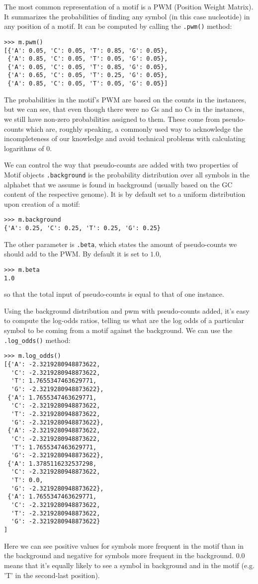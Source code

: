 \documentclass{article}
\begin{document}
The most common representation of a motif is a PWM (Position Weight
Matrix). It summarizes the probabilities of finding any symbol (in
this case nucleotide) in any position of a motif. It can be computed by calling the \verb|.pwm()| method:
\begin{verbatim}
>>> m.pwm()
[{'A': 0.05, 'C': 0.05, 'T': 0.85, 'G': 0.05}, 
 {'A': 0.85, 'C': 0.05, 'T': 0.05, 'G': 0.05}, 
 {'A': 0.05, 'C': 0.05, 'T': 0.85, 'G': 0.05}, 
 {'A': 0.65, 'C': 0.05, 'T': 0.25, 'G': 0.05}, 
 {'A': 0.85, 'C': 0.05, 'T': 0.05, 'G': 0.05}]
\end{verbatim}
The probabilities in the motif's PWM are based on the counts in the
instances, but we can see, that even though there were no Gs and no Cs
in the instances, we still have non-zero probabilities assigned to
them. These come from pseudo-counts which are, roughly speaking, a
commonly used way to acknowledge the incompleteness of our knowledge
and avoid technical problems with calculating logarithms of $0$.

We can control the way that pseudo-counts are added with two
properties of Motif objects \verb|.background| is the probability
distribution over all symbols in the alphabet that we assume is found
in background (usually based on the GC content of the respective
genome). It is by default set to a uniform distribution upon creation of a motif:
\begin{verbatim}
>>> m.background  
{'A': 0.25, 'C': 0.25, 'T': 0.25, 'G': 0.25}
\end{verbatim}
The other parameter is \verb|.beta|, which states the amount of
pseudo-counts we should add to the PWM. By default it is set to $1.0$,
\begin{verbatim}
>>> m.beta
1.0
\end{verbatim}
so that the total input of pseudo-counts is equal to that of one instance. 

Using the background distribution and pwm with pseudo-counts added,
it's easy to compute the log-odds ratios, telling us what are the log
odds of a particular symbol to be coming from a motif against the
background. We can use the \verb|.log_odds()| method:

\begin{verbatim}
>>> m.log_odds()
[{'A': -2.3219280948873622, 
  'C': -2.3219280948873622, 
  'T': 1.7655347463629771, 
  'G': -2.3219280948873622}, 
 {'A': 1.7655347463629771, 
  'C': -2.3219280948873622, 
  'T': -2.3219280948873622, 
  'G': -2.3219280948873622}, 
 {'A': -2.3219280948873622, 
  'C': -2.3219280948873622, 
  'T': 1.7655347463629771, 
  'G': -2.3219280948873622}, 
 {'A': 1.3785116232537298, 
  'C': -2.3219280948873622, 
  'T': 0.0, 
  'G': -2.3219280948873622}, 
 {'A': 1.7655347463629771, 
  'C': -2.3219280948873622, 
  'T': -2.3219280948873622, 
  'G': -2.3219280948873622}
]
\end{verbatim}
Here we can see positive values for symbols more frequent in the motif
than in the background and negative for symbols more frequent in the
background. $0.0$ means that it's equally likely to see a symbol in
background and in the motif (e.g. 'T' in the second-last position).
\end{document}
